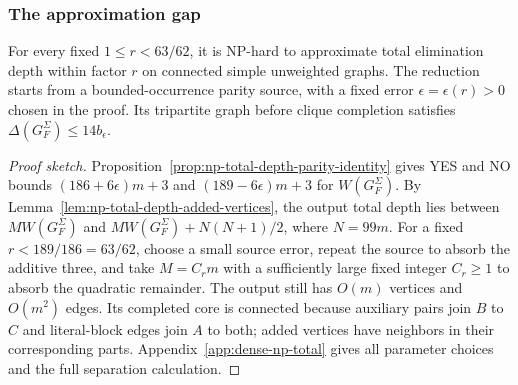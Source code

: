 \subsubsection{The approximation gap}

\begin{theorem}
\label{thm:np-total-depth-dense-gap}
For every fixed $1\leq r<63/62$, it is NP-hard to approximate total
elimination depth within factor $r$ on connected simple unweighted
graphs. The reduction starts from a bounded-occurrence parity source,
with a fixed error $\epsilon=\epsilon(r)>0$ chosen in the proof.
Its tripartite graph before clique completion satisfies
$\Delta(G_F^\Sigma)\leq14b_\epsilon$.
\end{theorem}

\begin{proof}[Proof sketch]
Proposition~\ref{prop:np-total-depth-parity-identity} gives YES and
NO bounds $(186+6\epsilon)m+3$ and $(189-6\epsilon)m+3$ for
$W(G_F^\Sigma)$. By Lemma~\ref{lem:np-total-depth-added-vertices},
the output total depth lies between $MW(G_F^\Sigma)$ and
$MW(G_F^\Sigma)+N(N+1)/2$, where $N=99m$.
For a fixed $r<189/186=63/62$, choose a small source error,
repeat the source to absorb the additive three, and take $M=C_rm$
with a sufficiently large fixed integer $C_r\geq1$ to absorb the quadratic
remainder. The output still has $O(m)$ vertices and $O(m^2)$ edges.
Its completed core is connected because auxiliary pairs join $B$
to $C$ and literal-block edges join $A$ to both; added vertices
have neighbors in their corresponding parts.
Appendix~\ref{app:dense-np-total} gives all parameter choices and
the full separation calculation.
\end{proof}
